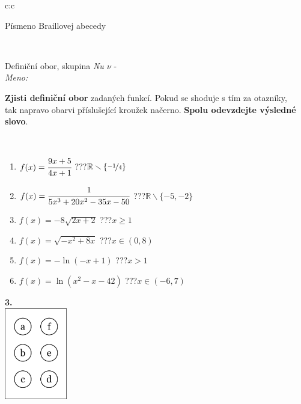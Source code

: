 \documentclass[10pt]{report}
\begin{document}
\begin{tabular}{c:c}
\begin{minipage}[c][104.5mm][t]{0.5\linewidth}
\begin{center}
\begin{minipage}{0.20\linewidth}
\begin{center}
{\small Písmeno Braillovej abecedy}
\end{center}
\end{minipage}
\end{center}
\end{minipage}
\\ \hdashline
\begin{minipage}[c][104.5mm][t]{0.5\linewidth}
\begin{center}
\vspace{7mm}
{\huge Definiční obor, skupina \textit{Nu $\nu$} -}\\[5mm]
\textit{Meno:}\phantom{xxxxxxxxxxxxxxxxxxxxxxxxxxxxxxxxxxxxxxxxxxxxxxxxxxxxxxxxxxxxxxxxx}\\[5mm]
\begin{minipage}{0.95\linewidth}
\textbf{Zjisti definiční obor} zadaných funkcí. Pokud se shoduje s tím za otazníky,\\tak napravo obarvi příslušející kroužek načerno. \textbf{Spolu odevzdejte výsledné slovo}.
\end{minipage}
\\[1mm]
\begin{minipage}{0.79\linewidth}
\begin{center}
\begin{varwidth}{\linewidth}
\begin{enumerate}
\normalsizerrr
\item $f(x)=\cfrac{9x+5}{4x+1}$\quad \dotfill\; ???\;\dotfill \quad $\mathbb{R}\smallsetminus\{\nicefrac{-1}{4}\}$
\item $f(x)=\cfrac{1}{5x^3+20x^2-35x-50}$\quad \dotfill\; ???\;\dotfill \quad $\mathbb{R}\smallsetminus\{-5,-2\}$
\item $f(x)=-8\sqrt{2x+2}$\quad \dotfill\; ???\;\dotfill \quad $x\geq1$
\item $f(x)=\sqrt{-x^2+8x}$\quad \dotfill\; ???\;\dotfill \quad $x\in(0 , 8)$
\item $f(x)=-\ln{(-x+1)}$\quad \dotfill\; ???\;\dotfill \quad $x>1$
\item $f(x)=\ln{(x^2-x-42)}$\quad \dotfill\; ???\;\dotfill \quad $x\in(-6 , 7)$
\end{enumerate}
\end{varwidth}
\end{center}
\end{minipage}
\begin{minipage}{0.20\linewidth}
\begin{center}
{\Huge\bfseries 3.} \\[2mm]
\includegraphics[height=40mm]{../images/braille.png}

\end{center}
\end{minipage}
\end{center}
\end{minipage}
\end{tabular}
\end{document}
